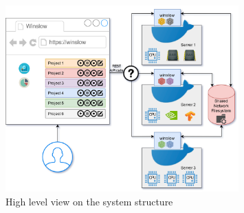
\begin{figure}[h]
	\centering
	\includegraphics[width=0.8\textwidth]{architecture.png}
	\caption{High level view on the system structure}
	\label{architecture:high-level}
\end{figure}


